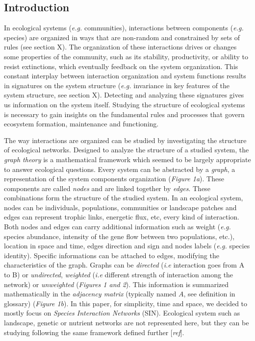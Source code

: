 \documentclass[12pt]{article}
\begin{document}
\subsection{Introduction}\label{introduction}

In ecological systems (\emph{e.g.} communities), interactions between
components (\emph{e.g.} species) are organized in ways that are
non-random and constrained by sets of rules (see section X). The
organization of these interactions drives or changes some properties of
the community, such as its stability, productivity, or ability to resist
extinctions, which eventually feedback on the system organization. This
constant interplay between interaction organization and system functions
results in signatures on the system structure (\emph{e.g.} invariance in
key features of the system structure, see section X). Detecting and
analyzing these signatures gives us information on the system itself.
Studying the structure of ecological systems is necessary to gain
insights on the fundamental rules and processes that govern ecosystem
formation, maintenance and functioning.

The way interactions are organized can be studied by investigating the
structure of ecological networks. Designed to analyze the structure of a
studied system, the \emph{graph theory} is a mathematical framework
which seemed to be largely appropriate to answer ecological questions.
Every system can be abstracted by a \emph{graph}, a representation of
the system components organization (\emph{Figure 1a}). These components
are called \emph{nodes} and are linked together by \emph{edges}. These
combinations form the structure of the studied system. In an ecological
system, nodes can be individuals, populations, communities or landscape
patches and edges can represent trophic links, energetic flux, etc,
every kind of interaction. Both nodes and edges can carry additional
information such as weight (\emph{e.g.} species abundance, intensity of
the gene flow between two populations, etc.), location in space and
time, edges direction and sign and nodes labels (\emph{e.g.} species
identity). Specific informations can be attached to edges, modifying the
characteristics of the graph. Graphs can be \emph{directed} (\emph{i.e}
interaction goes from A to B) or \emph{undirected}, \emph{weighted}
(\emph{i.e} different strength of interaction among the network) or
\emph{unweighted} (\emph{Figures 1 and 2}). This information is
summarized mathematically in the \emph{adjacency matrix} (typically
named \(A\), see definition in glossary) (\emph{Figure 1b}). In this
paper, for simplicity, time and space, we decided to mostly focus on
\emph{Species Interaction Networks} (SIN). Ecological system such as
landscape, genetic or nutrient networks are not represented here, but
they can be studying following the same framework defined further
{[}\emph{ref}{]}.
\end{document}

